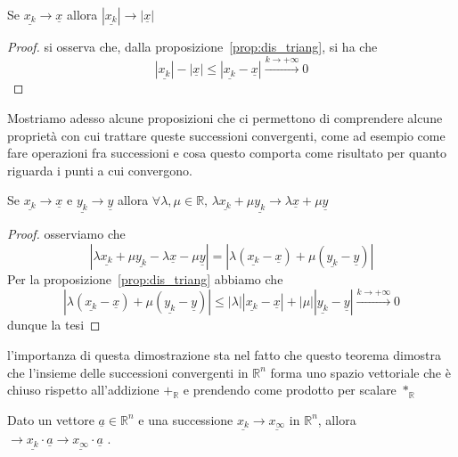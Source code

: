 %
\vspace{0.5cm}
\begin{prop}
Se $\underline{x_k} \to \underline{x}$ allora $|\underline{x_k}| \to |\underline{x}|$
\end{prop}

\begin{proof}
si osserva che, dalla proposizione~\ref{prop:dis_triang}, si ha che
$$
|\underline{x_k}| - |\underline{x}| \leq |\underline{x_k} - \underline{x}| \stackrel{k \to +\infty}{\to} 0
$$
\end{proof}

\vspace{0.5cm}
\noindent Mostriamo adesso alcune proposizioni che ci permettono di comprendere alcune proprietà con cui trattare queste successioni convergenti, come ad esempio come fare operazioni fra successioni e cosa questo comporta come risultato per quanto riguarda i punti a cui convergono.

\begin{prop}[\textcolor{blue}{spazio vettoriale delle successioni convergenti}]
Se $\underline{x_k} \to \underline{x}$ e $\underline{y_k} \to \underline{y}$ allora $\forall \lambda, \mu \in \mathbb{R}, \, \lambda \underline{x_k} + \mu \underline{y_k} \to \lambda \underline{x} + \mu \underline{y}$ 
\end{prop}

\begin{proof}
	osserviamo che
	$$
	|\lambda \underline{x_k} + \mu \underline{y_k} - \lambda \underline{x} - \mu \underline{y}| = |\lambda (\underline{x_k} - \underline{x}) + \mu (\underline{y_k} - \underline{y})|
	$$
	Per la proposizione~\ref{prop:dis_triang} abbiamo che
	$$
	|\lambda (\underline{x_k} - \underline{x}) + \mu (\underline{y_k} - \underline{y})| \leq |\lambda| |\underline{x_k} - \underline{x}| + |\mu| |\underline{y_k} - \underline{y}| \stackrel{k \to +\infty}{\to} 0
	$$
	dunque la tesi
\end{proof}

\begin{remark}
l'importanza di questa dimostrazione sta nel fatto che questo teorema dimostra che l'insieme delle successioni convergenti in $\mathbb{R}^n$ forma uno spazio vettoriale che è chiuso rispetto all'addizione $+_{\mathbb{R}}$ e prendendo come prodotto per scalare $*_{\mathbb{R}}$
\end{remark}


\begin{prop}
	Dato un vettore $\underline a\in \mathbb{R}^n$ e una successione $\underline{x_k}\rightarrow \underline{x_\infty}$ in $\mathbb{R}^n$, allora $\rightarrow \underline{x_k}\cdot \underline a \rightarrow \underline{x_\infty}\cdot \underline a$ .
\end{prop}

